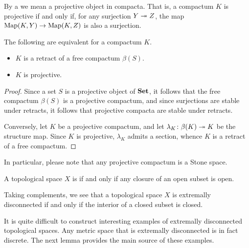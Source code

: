 \begin{dfn}
	By a  we mean a projective object in compacta.
	That is, a compactum $ K $ is projective if and only if, for any surjection $ Y \twoheadrightarrow Z $, the map $ \operatorname{Map}(K, Y) \to \operatorname{Map}(K, Z) $ is also a surjection.
\end{dfn}

\begin{lem}
	The following are equivalent for a compactum $ K $.
	\begin{itemize}
		\item $ K $ is a retract of a free compactum $ \beta(S) $.
		\item $ K $ is projective.
	\end{itemize}
\end{lem}

\begin{proof}
	Since a set $ S $ is a projective object of $ \textbf{\textup{Set}} $, it follows that the free compactum $ \beta(S) $ is a projective compactum,
	and since surjections are stable under retracts, it follows that projective compacta are stable under retracts.

	Conversely, let $ K $ be a projective compactum, and let $ \lambda_K \colon \beta(K) \twoheadrightarrow K $ be the structure map.
	Since $ K $ is projective, $ \lambda_K $ admits a section, whence $ K $ is a retract of a free compactum.
\end{proof}

\begin{nul}
	In particular, please note that any projective compactum is a Stone space.
\end{nul}

\begin{dfn}
	A topological space $ X $ is  if and only if any closure of an open subset is open.
\end{dfn}

\begin{nul}
	Taking complements, we see that a topological space $ X $ is extremally disconnected if and only if the interior of a closed subset is closed.
\end{nul}

\begin{nul}
	It is quite difficult to construct interesting examples of extremally disconnected topological spaces.
	Any metric space that is extremally disconnected is in fact discrete.
	The next lemma provides the main source of these examples.
\end{nul}

